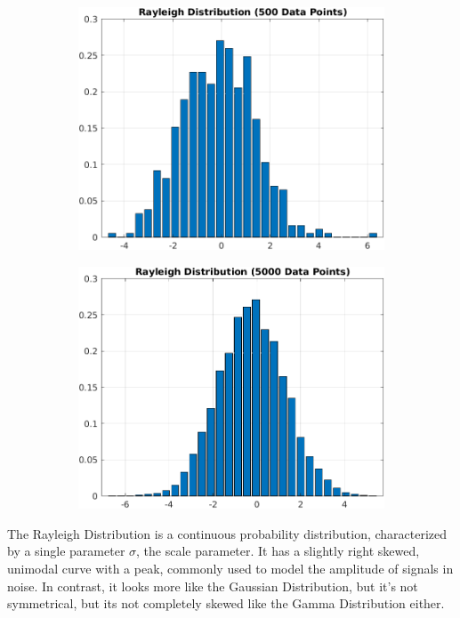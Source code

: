 \documentclass{article}
\theoremstyle{mytheoremstyle}
\theoremstyle{mytheoremstyle}
\theoremstyle{myproblemstyle}
\begin{document}
\begin{figure}[htbp]
    \begin{subfigure}[b]{0.5\textwidth}
        \includegraphics[width=\linewidth]{rayleigh_5.png}
    \end{subfigure}
    \begin{subfigure}[b]{0.5\textwidth}
        \includegraphics[width=\linewidth]{rayleigh_5k.png}    
    \end{subfigure}
\end{figure}

The Rayleigh Distribution is a continuous probability distribution, characterized by a single parameter $ \sigma $, the scale parameter. It has a slightly right skewed, unimodal curve with a peak, commonly used to model the amplitude of signals in noise. In contrast, it looks more like the Gaussian Distribution, but it's not symmetrical, but its not completely skewed like the Gamma Distribution either.
\end{document}
